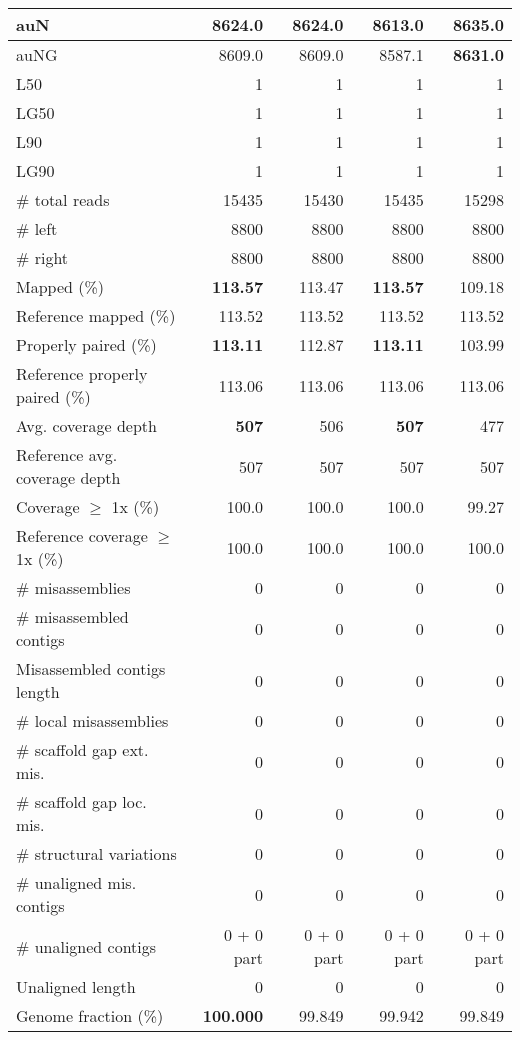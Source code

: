 \documentclass[12pt,a4paper]{article}
\begin{document}
\begin{table}[ht]
\begin{center}
\begin{tabular}{|l*{4}{|r}|}
auN & 8624.0 & 8624.0 & 8613.0 & {\bf 8635.0} \\ \hline
auNG & 8609.0 & 8609.0 & 8587.1 & {\bf 8631.0} \\ \hline
L50 & 1 & 1 & 1 & 1 \\ \hline
LG50 & 1 & 1 & 1 & 1 \\ \hline
L90 & 1 & 1 & 1 & 1 \\ \hline
LG90 & 1 & 1 & 1 & 1 \\ \hline
\# total reads & 15435 & 15430 & 15435 & 15298 \\ \hline
\# left & 8800 & 8800 & 8800 & 8800 \\ \hline
\# right & 8800 & 8800 & 8800 & 8800 \\ \hline
Mapped (\%) & {\bf 113.57} & 113.47 & {\bf 113.57} & 109.18 \\ \hline
Reference mapped (\%) & 113.52 & 113.52 & 113.52 & 113.52 \\ \hline
Properly paired (\%) & {\bf 113.11} & 112.87 & {\bf 113.11} & 103.99 \\ \hline
Reference properly paired (\%) & 113.06 & 113.06 & 113.06 & 113.06 \\ \hline
Avg. coverage depth & {\bf 507} & 506 & {\bf 507} & 477 \\ \hline
Reference avg. coverage depth & 507 & 507 & 507 & 507 \\ \hline
Coverage $\geq$ 1x (\%) & 100.0 & 100.0 & 100.0 & 99.27 \\ \hline
Reference coverage $\geq$ 1x (\%) & 100.0 & 100.0 & 100.0 & 100.0 \\ \hline
\# misassemblies & 0 & 0 & 0 & 0 \\ \hline
\# misassembled contigs & 0 & 0 & 0 & 0 \\ \hline
Misassembled contigs length & 0 & 0 & 0 & 0 \\ \hline
\# local misassemblies & 0 & 0 & 0 & 0 \\ \hline
\# scaffold gap ext. mis. & 0 & 0 & 0 & 0 \\ \hline
\# scaffold gap loc. mis. & 0 & 0 & 0 & 0 \\ \hline
\# structural variations & 0 & 0 & 0 & 0 \\ \hline
\# unaligned mis. contigs & 0 & 0 & 0 & 0 \\ \hline
\# unaligned contigs & 0 + 0 part & 0 + 0 part & 0 + 0 part & 0 + 0 part \\ \hline
Unaligned length & 0 & 0 & 0 & 0 \\ \hline
Genome fraction (\%) & {\bf 100.000} & 99.849 & 99.942 & 99.849 \\ \hline

\end{tabular}
\end{center}
\end{table}
\end{document}
